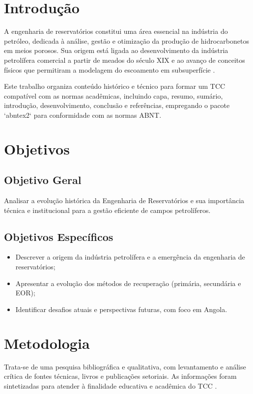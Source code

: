 \documentclass[12pt,a4paper,oneside,brazilian,sumario=tradicional]{abntex2}
\begin{document}
\tableofcontents*
\cleardoublepage

\textual

\chapter{Introdução}
A engenharia de reservatórios constitui uma área essencial na indústria do
petróleo, dedicada à análise, gestão e otimização da produção de
hidrocarbonetos em meios porosos. Sua origem está ligada ao desenvolvimento
da indústria petrolífera comercial a partir de meados do século XIX e ao
avanço de conceitos físicos que permitiram a modelagem do escoamento em
subsuperfície \cite{yergin1991,dake1994}.

Este trabalho organiza conteúdo histórico e técnico para formar um TCC
compatível com as normas acadêmicas, incluindo capa, resumo, sumário,
introdução, desenvolvimento, conclusão e referências, empregando o pacote
`abntex2` para conformidade com as normas ABNT.

\chapter{Objetivos}
\section{Objetivo Geral}
Analisar a evolução histórica da Engenharia de Reservatórios e sua
importância técnica e institucional para a gestão eficiente de campos
petrolíferos.

\section{Objetivos Específicos}
\begin{itemize}
  \item Descrever a origem da indústria petrolífera e a emergência da engenharia de reservatórios;
  \item Apresentar a evolução dos métodos de recuperação (primária, secundária e EOR);
  \item Identificar desafios atuais e perspectivas futuras, com foco em Angola.
\end{itemize}

\chapter{Metodologia}
Trata-se de uma pesquisa bibliográfica e qualitativa, com levantamento e
análise crítica de fontes técnicas, livros e publicações setoriais.
As informações foram sintetizadas para atender à finalidade educativa e
acadêmica do TCC \cite{ahmed2010,craft1991}.
\end{document}
